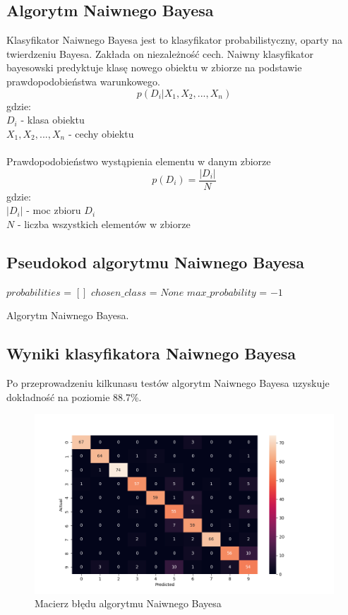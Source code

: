 \documentclass[12pt,a4paper]{article}
\begin{document}
\subsection{Algorytm Naiwnego Bayesa}
Klasyfikator Naiwnego Bayesa jest to klasyfikator probabilistyczny, oparty na twierdzeniu Bayesa.
Zakłada on niezależność cech. Naiwny klasyfikator bayesowski predyktuje klasę nowego obiektu w zbiorze na podstawie
prawdopodobieństwa warunkowego.
\[
	p(D_i | X_1, X_2, ..., X_n)
\]
gdzie:\\
\indent $D_i$ - klasa obiektu\\
\indent $X_1, X_2, ..., X_n$ - cechy obiektu\\~\\
Prawdopodobieństwo wystąpienia elementu w danym zbiorze
\[
	p(D_i) = \frac{|D_i|}{N}
\]
gdzie:\\
\indent $|D_i|$ - moc zbioru $D_i$\\
\indent $N$ - liczba wszystkich elementów w zbiorze
\subsection{Pseudokod algorytmu Naiwnego Bayesa}
\begin{algorithm}[H]
	$probabilities$ = $[]$\;
	$chosen\_class$ = $None$\;
	$max\_probability$ = $-1$\;
	\caption{Algorytm Naiwnego Bayesa.}
\end{algorithm}

\subsection{Wyniki klasyfikatora Naiwnego Bayesa}
Po przeprowadzeniu kilkunasu testów algorytm Naiwnego Bayesa uzyskuje dokładność
na poziomie 88.7\%.
\newpage
\begin{figure}[!h]
	\includegraphics[scale=0.80]{"confusion_matrix_bayes.png"}
	\centering
	\caption{Macierz błędu algorytmu Naiwnego Bayesa}
\end{figure}
\end{document}
